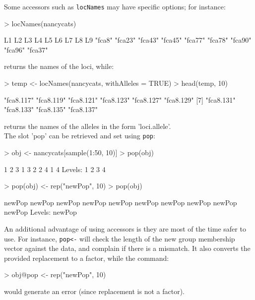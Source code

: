 \documentclass{article}
\begin{document}
\noindent Some accessors such as \texttt{locNames} may have specific options; for instance:
\begin{Schunk}
\begin{Sinput}
> locNames(nancycats)
\end{Sinput}
\begin{Soutput}
     L1      L2      L3      L4      L5      L6      L7      L8      L9 
 "fca8" "fca23" "fca43" "fca45" "fca77" "fca78" "fca90" "fca96" "fca37" 
\end{Soutput}
\end{Schunk}
returns the names of the loci, while:
\begin{Schunk}
\begin{Sinput}
> temp <- locNames(nancycats, withAlleles = TRUE)
> head(temp, 10)
\end{Sinput}
\begin{Soutput}
 [1] "fca8.117" "fca8.119" "fca8.121" "fca8.123" "fca8.127" "fca8.129"
 [7] "fca8.131" "fca8.133" "fca8.135" "fca8.137"
\end{Soutput}
\end{Schunk}
returns the names of the alleles in the form 'loci.allele'.
\\

\noindent The slot 'pop' can be retrieved and set using \texttt{pop}:
\begin{Schunk}
\begin{Sinput}
> obj <- nancycats[sample(1:50, 10)]
> pop(obj)
\end{Sinput}
\begin{Soutput}
 [1] 1 2 3 1 3 2 2 4 1 4
Levels: 1 2 3 4
\end{Soutput}
\begin{Sinput}
> pop(obj) <- rep("newPop", 10)
> pop(obj)
\end{Sinput}
\begin{Soutput}
 [1] newPop newPop newPop newPop newPop newPop newPop newPop newPop newPop
Levels: newPop
\end{Soutput}
\end{Schunk}
An additional advantage of using accessors is they are most of the time safer to use. For instance,
\texttt{pop<-} will check the length of the new group membership vector against the data, and
complain if there is a mismatch. It also converts the provided replacement to a factor, while the command:
\begin{Schunk}
\begin{Sinput}
> obj@pop <- rep("newPop", 10)
\end{Sinput}
\end{Schunk}
would generate an error (since replacement is not a factor).
\end{document}
